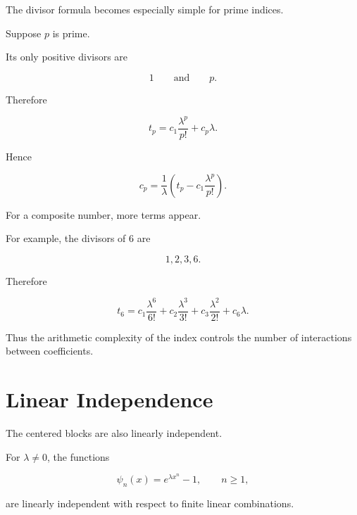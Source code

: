 The divisor formula becomes especially simple for prime indices.

Suppose \(p\) is prime.

Its only positive divisors are

\[
1
\qquad\text{and}\qquad
p.
\]

Therefore

\[
t_p
=
c_1\frac{\lambda^p}{p!}
+
c_p\lambda.
\]

Hence

\[
\boxed{
c_p
=
\frac{1}{\lambda}
\left(
t_p
-
c_1\frac{\lambda^p}{p!}
\right).
}
\]

For a composite number, more terms appear.

For example, the divisors of \(6\) are

\[
1,2,3,6.
\]

Therefore

\[
t_6
=
c_1\frac{\lambda^6}{6!}
+
c_2\frac{\lambda^3}{3!}
+
c_3\frac{\lambda^2}{2!}
+
c_6\lambda.
\]

Thus the arithmetic complexity of the index controls the number of
interactions between coefficients.

\section{Linear Independence}

The centered blocks are also linearly independent.

\begin{proposition}

For \(\lambda\neq0\), the functions

\[
\psi_n(x)
=
e^{\lambda x^n}-1,
\qquad n\geq1,
\]

are linearly independent with respect to finite linear combinations.

\end{proposition}

